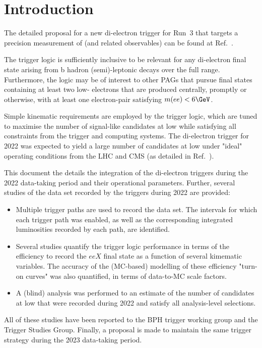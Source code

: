 \clearpage
\section{Introduction}

The detailed proposal for a new di-electron trigger for Run~3 that
targets a precision measurement of \rk (and related observables) can
be found at Ref.~\cite{AN-21-160}.

The trigger logic is sufficiently inclusive to be relevant for any
di-electron final state arising from b hadron (semi)-leptonic decays
over the full \qsq range. Furthermore, the logic may be of interest to
other PAGs that pursue final states containing at least two low-\pt
electrons that are produced centrally, promptly or otherwise, with at
least one electron-pair satisfying $m(ee) < 6\GeV$.

Simple kinematic requirements are employed by the trigger logic, which
are tuned to maximise the number of signal-like \bkee candidates at
low \qsq while satisfying all constraints from the trigger and
computing systems. The di-electron trigger for 2022 was expected to
yield a large number of \bkee candidates at low \qsq under "ideal"
operating conditions from the LHC and CMS (as detailed in
Ref.~\cite{AN-21-160}).

This document the details the integration of the di-electron triggers
during the 2022 data-taking period and their operational
parameters. Further, several studies of the data set recorded by the
triggers during 2022 are provided:
\begin{itemize}
\item Multiple trigger paths are used to record the data set. The
  intervals for which each trigger path was enabled, as well as the
  corresponding integrated luminosities recorded by each path, are
  identified.
\item Several studies quantify the trigger logic performance in terms
  of the efficiency to record the $eeX$ final state as a function of
  several kimematic variables. The accuracy of the (MC-based)
  modelling of these efficiency "turn-on curves" was also quantified,
  in terms of data-to-MC scale factors.
\item A (blind) analysis was performed to an estimate of the number of
  \bkee candidates at low \qsq that were recorded during 2022 and
  satisfy all analysis-level selections.
\end{itemize}
All of these studies have been reported to the BPH trigger working
group and the Trigger Studies Group. Finally, a proposal is made to
maintain the same trigger strategy during the 2023 data-taking period.
